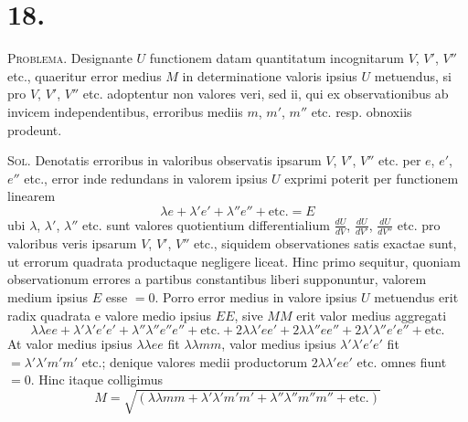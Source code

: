 \documentclass[12pt,a4paper]{book}
\begin{document}
\vspace{1em}

\section*{18.}
\label{sec:art18}

\textsc{Problema.} Designante $U$ functionem datam quantitatum incognitarum $V$, $V'$, $V''$ etc., quaeritur error medius $M$ in determinatione valoris ipsius $U$ metuendus, si pro $V$, $V'$, $V''$ etc. adoptentur non valores veri, sed ii, qui ex observationibus ab invicem independentibus, erroribus mediis $m$, $m'$, $m''$ etc. resp. obnoxiis prodeunt.

\textsc{Sol.} Denotatis erroribus in valoribus observatis ipsarum $V$, $V'$, $V''$ etc. per $e$, $e'$, $e''$ etc., error inde redundans in valorem ipsius $U$ exprimi poterit per functionem linearem
%
\begin{equation*}
\lambda e+\lambda'e'+\lambda''e''+\text{etc.}=E
\end{equation*}
ubi $\lambda$, $\lambda'$, $\lambda''$ etc. sunt valores quotientium differentialium $\tfrac{dU}{dV}$, $\tfrac{dU}{dV'}$, $\tfrac{dU}{dV''}$ etc. pro valoribus veris ipsarum $V$, $V'$, $V''$ etc., siquidem observationes satis exactae sunt, ut errorum quadrata productaque negligere liceat. Hinc primo sequitur, quoniam observationum errores a partibus constantibus liberi supponuntur, valorem medium ipsius $E$ esse $=0$. Porro error medius in valore ipsius $U$ metuendus erit radix quadrata e valore medio ipsius $EE$, sive $MM$ erit valor medius aggregati
%
\begin{equation*}
\lambda\lambda ee+\lambda'\lambda'e'e'+\lambda''\lambda''e''e''+\text{etc.}+2\lambda\lambda'ee'+2\lambda\lambda''ee''+2\lambda'\lambda''e'e''+\text{etc.}
\end{equation*}
At valor medius ipsius $\lambda\lambda ee$ fit $\lambda\lambda mm$, valor medius ipsius $\lambda'\lambda'e'e'$ fit $=\lambda'\lambda'm'm'$ etc.; denique valores medii productorum $2\lambda\lambda'ee'$ etc. omnes fiunt $=0$. Hinc itaque colligimus
%
\begin{equation*}
M=\sqrt{(\lambda\lambda mm+\lambda'\lambda'm'm'+\lambda''\lambda''m''m''+\text{etc.})}
\end{equation*}
\end{document}
